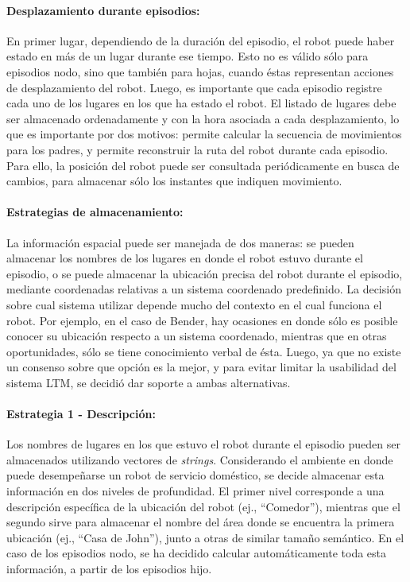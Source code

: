 \paragraph{Desplazamiento durante episodios:}
En primer lugar, dependiendo de la duración del episodio, el robot puede haber estado en más de un lugar durante ese tiempo. Esto no es válido sólo para episodios nodo, sino que también para hojas, cuando éstas representan acciones de desplazamiento del robot. Luego, es importante que cada episodio registre cada uno de los lugares en los que ha estado el robot. El listado de lugares debe ser almacenado ordenadamente y con la hora asociada a cada desplazamiento, lo que es importante por dos motivos: permite calcular la secuencia de movimientos para los padres, y permite reconstruir la ruta del robot durante cada episodio. Para ello, la posición del robot puede ser consultada periódicamente en busca de cambios, para almacenar sólo los instantes que indiquen movimiento.


\paragraph{Estrategias de almacenamiento:}
La información espacial puede ser manejada de dos maneras: se pueden almacenar los nombres de los lugares en donde el robot estuvo durante el episodio, o se puede almacenar la ubicación precisa del robot durante el episodio, mediante coordenadas relativas a un sistema coordenado predefinido. La decisión sobre cual sistema utilizar depende mucho del contexto en el cual funciona el robot. Por ejemplo, en el caso de Bender, hay ocasiones en donde sólo es posible conocer su ubicación respecto a un sistema coordenado, mientras que en otras oportunidades, sólo se tiene conocimiento verbal de ésta. Luego, ya que no existe un consenso sobre que opción es la mejor, y para evitar limitar la usabilidad del sistema LTM, se decidió dar soporte a ambas alternativas.

\paragraph{Estrategia 1 - Descripción:}
Los nombres de lugares en los que estuvo el robot durante el episodio pueden ser almacenados utilizando vectores de \textit{strings}. Considerando el ambiente en donde puede desempeñarse un robot de servicio doméstico, se decide almacenar esta información en dos niveles de profundidad. El primer nivel corresponde a una descripción específica de la ubicación del robot (ej., ``Comedor''), mientras que el segundo sirve para almacenar el nombre del área donde se encuentra la primera ubicación (ej., ``Casa de John''), junto a otras de similar tamaño semántico. En el caso de los episodios nodo, se ha decidido calcular automáticamente toda esta información, a partir de los episodios hijo.

